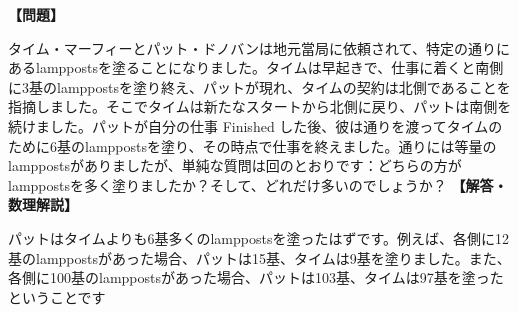 \documentclass[10pt,a4paper,oneside,openany]{ltjsbook}
\begin{document}
\begin{tcolorbox}[colback=softblue,colframe=primaryblue,title=\textbf{第 103 問：lamppostsを塗る （原題: PAINTING THE LAMP-POSTS.）},arc=2mm,boxrule=1pt,breakable]
\textbf{【問題】}\par\vspace{0.3em}
タイム・マーフィーとパット・ドノバンは地元當局に依頼されて、特定の通りにあるlamppostsを塗ることになりました。タイムは早起きで、仕事に着くと南側に3基のlamppostsを塗り終え、パットが現れ、タイムの契約は北側であることを指摘しました。そこでタイムは新たなスタートから北側に戻り、パットは南側を続けました。パットが自分の仕事 Finished した後、彼は通りを渡ってタイムのために6基のlamppostsを塗り、その時点で仕事を終えました。通りには等量のlamppostsがありましたが、単純な質問は回のとおりです：どちらの方がlamppostsを多く塗りましたか？そして、どれだけ多いのでしょうか？
\tcblower
\textbf{【解答・数理解説】}\par\vspace{0.3em}
パットはタイムよりも6基多くのlamppostsを塗ったはずです。例えば、各側に12基のlamppostsがあった場合、パットは15基、タイムは9基を塗りました。また、各側に100基のlamppostsがあった場合、パットは103基、タイムは97基を塗ったということです
\end{tcolorbox}
\end{document}
